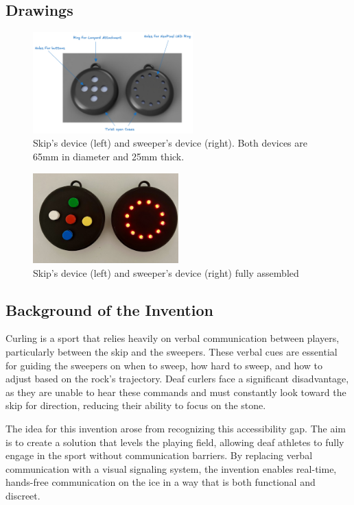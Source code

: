 \documentclass{article}
\begin{document}
\subsection{Drawings}

\begin{figure}[ht!]
    \centering
    \includegraphics[width=0.55\textwidth]{labeled_render.png}
    \caption{Skip's device (left) and sweeper's device (right). Both devices are 65mm in diameter and 25mm thick.}
    \label{fig:device}
\end{figure}

\begin{figure}[ht!]
    \centering
    \includegraphics[width=0.50\textwidth]{device_assembled.jpeg}
    \caption{Skip's device (left) and sweeper's device (right) fully assembled}
    \label{fig:built_devices}
\end{figure}

\subsection{Background of the Invention}
Curling is a sport that relies heavily on verbal communication between players, particularly between the skip and the sweepers. These verbal cues are essential for guiding the sweepers on when to sweep, how hard to sweep, and how to adjust based on the rock's trajectory. Deaf curlers face a significant disadvantage, as they are unable to hear these commands and must constantly look toward the skip for direction, reducing their ability to focus on the stone.

The idea for this invention arose from recognizing this accessibility gap. The aim is to create a solution that levels the playing field, allowing deaf athletes to fully engage in the sport without communication barriers. By replacing verbal communication with a visual signaling system, the invention enables real-time, hands-free communication on the ice in a way that is both functional and discreet.
\end{document}
